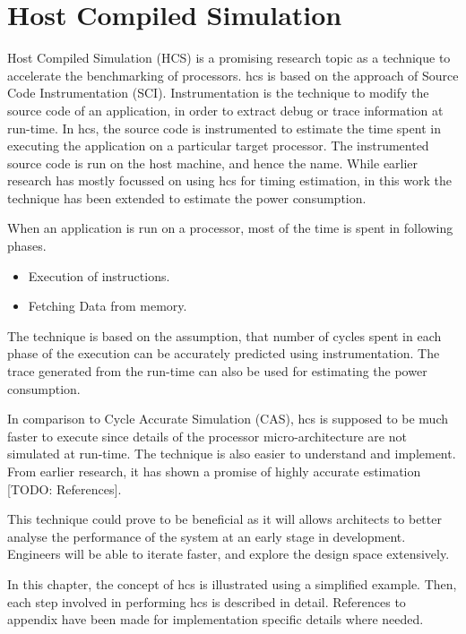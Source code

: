 \chapter{Host Compiled Simulation}

Host Compiled Simulation (HCS) is a promising research topic as a technique to accelerate the benchmarking of processors. \gls{hcs} is based on the approach of Source Code Instrumentation (SCI). Instrumentation is the technique to modify the source code of an application, in order to extract debug or trace information at run-time. In \gls{hcs}, the source code is instrumented to estimate the time spent in executing the application on a particular target processor. The instrumented source code is run on the host machine, and hence the name. While earlier research has mostly focussed on using \gls{hcs} for timing estimation, in this work the technique has been extended to estimate the power consumption.

When an application is run on a processor, most of the time is spent in following phases.

\begin{itemize} \itemsep -6pt
\item Execution of instructions.
\item Fetching Data from memory.
\end{itemize}

The technique is based on the assumption, that number of cycles spent in each phase of the execution can be accurately predicted using instrumentation. The trace generated from the run-time can also be used for estimating the power consumption.

In comparison to Cycle Accurate Simulation (CAS), \gls{hcs} is supposed to be much faster to execute since details of the processor micro-architecture are not simulated at run-time. The technique is also easier to understand and implement. From earlier research, it has shown a promise of highly accurate estimation [TODO: References].

This technique could prove to be beneficial as it will allows architects to better analyse the performance of the system at an early stage in development. Engineers will be able to iterate faster, and explore the design space extensively.

In this chapter, the concept of \gls{hcs} is illustrated using a simplified example. Then, each step involved in performing \gls{hcs} is described in detail. References to appendix have been made for implementation specific details where needed.

